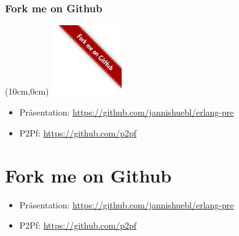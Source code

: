 \begin{frame} %
  \frametitle{Fork me on Github} %
   \begin{textblock*}{3cm}(10cm,0cm) %
   \includegraphics[width=3cm]{img/forkme}
   \end{textblock*}
  \begin{itemize} %
    \item Präsentation: \url{https://github.com/jannishuebl/erlang-pre}
    \item P2Pf:         \url{https://github.com/p2pf}
  \end{itemize}
\end{frame}
\mode*

\section{Fork me on Github}
  \begin{itemize} %
    \item Präsentation: \url{https://github.com/jannishuebl/erlang-pre}
    \item P2Pf:         \url{https://github.com/p2pf}
  \end{itemize}
\mode*


